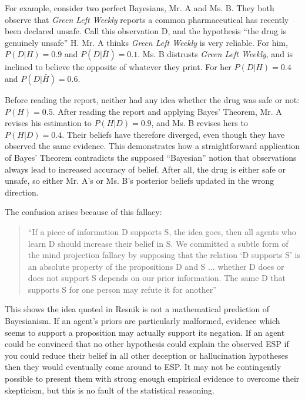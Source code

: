 \documentclass{article}
\begin{document}
For example, consider two perfect Bayesians, Mr. A and Ms. B. They both observe that \textit{Green Left Weekly} reports a common pharmaceutical has recently been declared unsafe. Call this observation D, and the hypothesis ``the drug is genuinely unsafe'' H. Mr. A thinks \textit{Green Left Weekly} is very reliable. For him, \(P(D|H) = 0.9\) and \(P(D|\bar{H}) = 0.1\). Ms. B distrusts \textit{Green Left Weekly}, and is inclined to believe the opposite of whatever they print. For her \(P(D|H) = 0.4\) and \(P(D|\bar{H}) = 0.6\).

Before reading the report, neither had any idea whether the drug was safe or not: \(P(H) = 0.5\). After reading the report and applying Bayes' Theorem, Mr. A revises his estimation to \(P(H|D) = 0.9\), and Ms. B revises hers to \(P(H|D) = 0.4\). Their beliefs have therefore diverged, even though they have observed the same evidence. This demonstrates how a straightforward application of Bayes' Theorem contradicts the supposed ``Bayesian'' notion that observations always lead to increased accuracy of belief. After all, the drug is either safe or unsafe, so either Mr. A's or Ms. B's posterior beliefs updated in the wrong direction.

The confusion arises because of this fallacy: 

\begin{quote}
``If a piece of information D supports S, the idea goes, then all agents who learn D should increase their belief in S. We committed a subtle form of the mind projection fallacy by supposing that the relation ‘D supports S’ is an absolute property of the propositions D and S ... whether D does or does not support S depends on our prior information. The same D that supports S for one person may refute it for another'' \citep[pg. 131]{jaynes2003probability}
\end{quote}

\noindent
This shows the idea quoted in Resnik is not a mathematical prediction of Bayesianism. If an agent's priors are particularly malformed, evidence which seems to support a proposition may actually support its negation. If an agent could be convinced that no other hypothesis could explain the observed ESP \textemdash{} if you could reduce their belief in all other deception or hallucination hypotheses \textemdash{} then they would eventually come around to ESP. It may not be contingently possible to present them with strong enough empirical evidence to overcome their skepticism, but this is no fault of the statistical reasoning.
\end{document}
